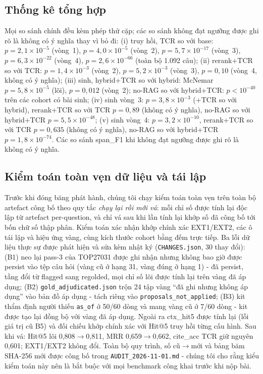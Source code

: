 \documentclass[11pt,a4paper]{article}
\begin{document}
\subsection{Thống kê tổng hợp}

Mọi so sánh chính đều kèm phép thử cặp; các so sánh không đạt ngưỡng được ghi rõ là không có ý nghĩa thay vì bỏ đi: (i) truy hồi, TCR so với base: $p=2{,}1\times10^{-5}$ (vòng~1), $p=4{,}0\times10^{-5}$ (vòng~2), $p=5{,}7\times10^{-17}$ (vòng~3), $p=6{,}3\times10^{-22}$ (vòng~4), $p=2{,}6\times10^{-66}$ (toàn bộ 1.092 câu); (ii) rerank+TCR so với TCR: $p=1{,}4\times10^{-3}$ (vòng~2), $p=5{,}2\times10^{-3}$ (vòng~3), $p=0{,}10$ (vòng~4, không có ý nghĩa); (iii) sinh, hybrid+TCR so với hybrid: McNemar $p=5{,}8\times10^{-5}$ (lõi), $p=0{,}012$ (vòng~2); no-RAG so với hybrid+TCR: $p<10^{-40}$ trên các cohort có bài sinh; (iv) sinh vòng~3: $p=3{,}8\times10^{-3}$ (+TCR so với hybrid), rerank+TCR so với TCR $p=0{,}89$ (không có ý nghĩa), no-RAG so với hybrid+TCR $p=5{,}5\times10^{-48}$; (v) sinh vòng~4: $p=3{,}2\times10^{-10}$, rerank+TCR so với TCR $p=0{,}635$ (không có ý nghĩa), no-RAG so với hybrid+TCR $p=1{,}8\times10^{-74}$. Các so sánh span\_F1 khi không đạt ngưỡng được ghi rõ là không có ý nghĩa.

\subsection{Kiểm toán toàn vẹn dữ liệu và tái lập}
\label{sec:audit}

Trước khi đóng băng phát hành, chúng tôi chạy kiểm toán toàn vẹn trên toàn bộ artefact công bố theo quy tắc \emph{chạy lại rồi mới vá}: mỗi chỉ số được tính lại độc lập từ artefact per-question, và chỉ vá sau khi lần tính lại khớp số đã công bố tới bốn chữ số thập phân. Kiểm toán xác nhận khớp chính xác EXT1/EXT2, các ô tái lập và hiệu ứng vàng, cùng kích thước cohort bằng đếm trực tiếp. Ba lỗi dữ liệu thực sự được phát hiện và sửa kèm nhật ký (\texttt{CHANGES.json}, 30 thay đổi): (B1) neo lại pass-3 của TOP27031 được ghi nhận nhưng không bao giờ được persist vào tệp câu hỏi (vàng cũ ở hạng 31, vàng đúng ở hạng 1) - đã persist, tầng đổi từ flagged sang regolded, mọi chỉ số lõi được tính lại trên vàng đã áp dụng; (B2) \texttt{gold\_adjudicated.json} trộn 24 tập vàng ``đã ghi nhưng không áp dụng'' vào bản đồ áp dụng - tách riêng vào \texttt{proposals\_not\_applied}; (B3) kit thẩm định người thiếu \texttt{as\_of} ở 50/60 dòng và mang vàng cũ ở 7/60 dòng - kit được tạo lại đồng bộ với vàng đã áp dụng. Ngoài ra ctx\_hit5 được tính lại (lỗi giá trị cũ B5) và đối chiếu khớp chính xác với Hit@5 truy hồi từng cấu hình. Sau khi vá: Hit@5 lõi 0,808$\rightarrow$0,811, MRR 0,659$\rightarrow$0,662, cite\_acc TCR giữ nguyên 0,601; EXT1/EXT2 không đổi. Toàn bộ quy trình, số cũ$\rightarrow$mới và bảng băm SHA-256 mới được công bố trong \texttt{AUDIT\_2026-11-01.md} - chúng tôi cho rằng kiểu kiểm toán này nên là bắt buộc với mọi benchmark công khai trước khi nộp bài.
\end{document}
